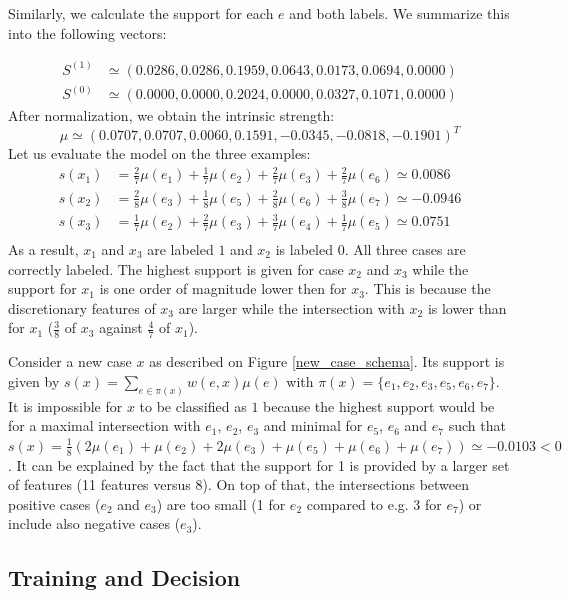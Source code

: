 \documentclass[sigconf,edbt]{acmart-edbt-workshops}
\begin{document}
Similarly, we calculate the support for each $e$ and both labels. We summarize this into the following vectors:

\begin{align*}
S^{(1)} & \simeq (
0.0286,
0.0286,
0.1959 ,
0.0643,
0.0173,
0.0694, 
0.0000) \\ S^{(0)} &\simeq (
0.0000,
0.0000,
0.2024,
0.0000,
0.0327,
0.1071, 
0.0000)\end{align*} After normalization, we obtain the intrinsic strength:
$$\mu \simeq (0.0707, 0.0707, 0.0060, 0.1591, -0.0345, -0.0818, -0.1901)^T$$
Let us evaluate the model on the three examples:
\begin{align*}
  s(x_1) & = \frac{2}{7}\mu(e_1) + \frac{1}{7}\mu(e_2) + \frac{2}{7}\mu(e_3) + \frac{2}{7}\mu(e_6) \simeq 0.0086\\
  s(x_2) & = \frac{2}{8}\mu(e_3) + \frac{1}{8}\mu(e_5) + \frac{2}{8}\mu(e_6) + \frac{3}{8}\mu(e_7) \simeq -0.0946\\
  s(x_3) & = \frac{1}{7}\mu(e_2) + \frac{2}{7}\mu(e_3) + \frac{3}{7}\mu(e_4) + \frac{1}{7}\mu(e_5) \simeq 0.0751\\
\end{align*}
As a result, $x_1$ and $x_3$ are labeled $1$ and $x_2$ is labeled $0$. All three cases are correctly labeled. The highest support is given for case $x_2$ and $x_3$ while the support for $x_1$ is one order of magnitude lower then for $x_3$. This is because the discretionary features of $x_3$ are larger while the intersection with $x_2$ is lower than for $x_1$ ($\frac 3 8$ of $x_3$ against $\frac 4 7$ of $x_1$).

Consider a new case $x$ as described on Figure \ref{new_case_schema}. Its support is given by $s(x) = \underset{e \in \pi(x)}{\sum} w(e, x)\mu(e)$ with $\pi(x) = \{ e_1, e_2, e_3, e_5, e_6, e_7\}$. It is impossible for $x$ to be classified as $1$ because the highest support would be for a maximal intersection with $e_1$, $e_2$, $e_3$ and minimal for $e_5$, $e_6$ and $e_7$ such that $s(x) = \frac{1}{8}(2 \mu(e_1) + \mu(e_2) + 2 \mu(e_3) + \mu(e_5) + \mu(e_6) + \mu(e_7)) \simeq -0.0103 < 0$. It can be explained by the fact that the support for 1 is provided by a larger set of features (11 features versus 8). On top of that, the intersections between positive cases ($e_2$ and $e_3$) are too small (1 for $e_2$ compared to e.g. 3 for $e_7$) or include also negative cases ($e_3$).

\subsection{Training and Decision}
\label{sec:decision_training}
\end{document}
